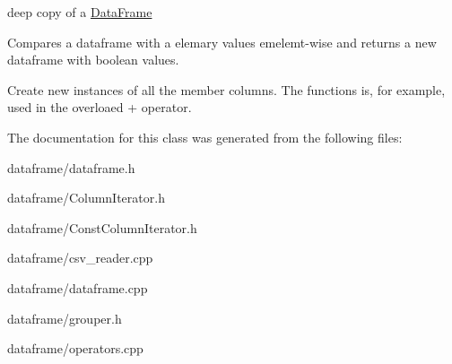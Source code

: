 deep copy of a \hyperlink{classDataFrame}{Data\+Frame} 

Compares a dataframe with a elemary values emelemt-\/wise and returns a new dataframe with boolean values.

Create new instances of all the member columns. The functions is, for example, used in the overloaed + operator. 

The documentation for this class was generated from the following files\+:\begin{DoxyCompactItemize}
\item 
dataframe/dataframe.\+h\item 
dataframe/Column\+Iterator.\+h\item 
dataframe/Const\+Column\+Iterator.\+h\item 
dataframe/csv\+\_\+reader.\+cpp\item 
dataframe/dataframe.\+cpp\item 
dataframe/grouper.\+h\item 
dataframe/operators.\+cpp\end{DoxyCompactItemize}
